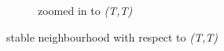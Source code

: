 \begin{figure}[H]
\begin{subfigure}{.5\textwidth}
    \caption{zoomed in to \textit{(T,T)}}
    \label{fig:Weak2x2-2b}
\end{subfigure}
\caption{stable neighbourhood with respect to \textit{(T,T)}}
\label{fig:Weak2x2-2}
\end{figure}







